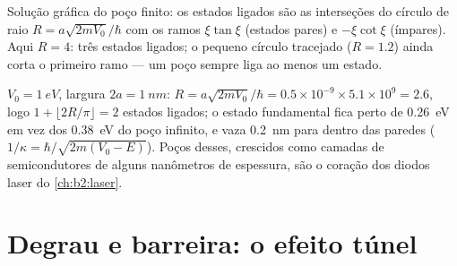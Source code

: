 \begin{omfigure}

{\small Solução gráfica do poço finito: os estados ligados são
as interseções do círculo de raio $R = a\sqrt{2mV_0}/\hbar$ com
os ramos $\xi\tan\xi$ (estados pares) e $-\xi\cot\xi$ (ímpares). Aqui
$R = 4$: três estados ligados; o pequeno círculo tracejado ($R = 1.2$) ainda
corta o primeiro ramo --- um poço sempre liga ao menos um estado.}
\end{omfigure}

\begin{example}\label{ex:b2:potential-wells-tunneling:finite}
$V_0 = \qty{1}{eV}$, largura $2a = \qty{1}{nm}$: $R = a\sqrt{2mV_0}/\hbar = 0.5 \times
10^{-9} \times 5.1 \times 10^9 = 2.6$, logo $1 + \lfloor 2R/\pi\rfloor = 2$ estados
ligados; o estado fundamental fica perto de \qty{0.26}{eV} em vez dos
\qty{0.38}{eV} do poço infinito, e vaza \qty{0.2}{nm} para dentro das paredes
($1/\kappa = \hbar/\sqrt{2m(V_0 - E)}$). Poços desses, crescidos como camadas de
semicondutores de alguns nanômetros de espessura, são o coração dos
diodos laser do \cref{ch:b2:laser}.
\end{example}

\section{Degrau e barreira: o efeito túnel}

